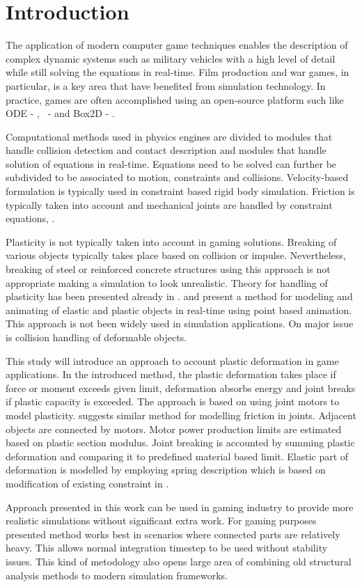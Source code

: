 \section{Introduction}

The application of modern computer game techniques enables the description of complex dynamic systems 
such as military vehicles with a high level of detail while still solving the equations in real-time.
Film production and war games, in particular, is a key area that have benefited from simulation technology. 
In practice, games are often accomplished using an open-source platform such 
like ODE - \cite{ode}, \bullet\ - \cite{bullet} and Box2D - \cite{box2d}.

Computational methods used in physics engines are divided to modules that handle collision detection and 
contact description and modules that handle solution of equations in real-time. Equations need to be 
solved can further be subdivided to be associated to motion, constraints and collisions. 
Velocity-based formulation is typically used in constraint based rigid body simulation. 
Friction is typically taken into account and mechanical joints are handled by constraint equations,
\cite{erleben.thesis}.

Plasticity is not typically taken into account in gaming solutions. 
Breaking of various objects typically takes place based on collision or impulse.
Nevertheless, breaking of steel or reinforced concrete structures using this approach 
is not appropriate making a simulation to look unrealistic. Theory for handling of plasticity 
has been presented already in \cite{cg1988}. \cite{muller2004point} and \cite{muller2005meshless} 
present a method for modeling and animating of elastic and plastic objects in real-time using 
point based animation. This approach is not been widely used in simulation applications.  
On major issue is collision handling of deformable objects.

This study will introduce an approach to account plastic deformation in game applications.   
In the introduced method, the plastic deformation takes place if force or moment exceeds given 
limit, deformation absorbs energy and joint breaks if plastic capacity is exceeded. 
The approach is based on using joint motors to model plasticity. \citet[p.~90]{erleben.thesis} 
suggests similar method for modelling friction in joints. Adjacent objects are connected by motors. 
Motor power production limits are estimated based on plastic section modulus. 
Joint breaking is accounted by summing plastic deformation and comparing it to 
predefined material based limit. Elastic part of deformation is modelled by employing 
spring description which is based on modification of existing constraint in \bullet.

Approach presented in this work can be used in gaming industry to provide more realistic 
simulations without significant extra work. For gaming purposes presented method works 
best in scenarios where connected parts are relatively heavy. This allows normal 
integration timestep to be used without stability issues. 
This kind of metodology also opens large area of combining old structural analysis
methods to modern simulation frameworks.

